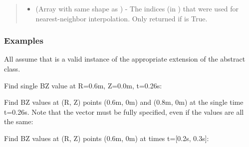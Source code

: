 \documentclass[letterpaper,10pt,english]{sphinxmanual}
\begin{document}
\begin{fulllineitems}
\begin{fulllineitems}
\begin{quote}
\begin{description}
\begin{itemize}
\item {} 
 (Array with same shape as ) - The indices
(in ) that were used for
nearest-neighbor interpolation. Only returned if  is
True.

\end{itemize}


\end{description}\end{quote}
\subsubsection*{Examples}

All assume that  is a valid instance of the appropriate
extension of the  abstract class.

Find single BZ value at R=0.6m, Z=0.0m, t=0.26s:

\begin{sphinxVerbatim}[commandchars=\\\{\}]
    
\end{sphinxVerbatim}

Find BZ values at (R, Z) points (0.6m, 0m) and (0.8m, 0m) at the
single time t=0.26s. Note that the  vector must be fully
specified, even if the values are all the same:

\begin{sphinxVerbatim}[commandchars=\\\{\}]
  \PYG{p}{[} \PYG{p}{]} \PYG{p}{[} \PYG{p}{]} 
\end{sphinxVerbatim}

Find BZ values at (R, Z) points (0.6m, 0m) at times t={[}0.2s, 0.3s{]}:

\begin{sphinxVerbatim}[commandchars=\\\{\}]
    \PYG{p}{[} \PYG{p}{]}
\end{sphinxVerbatim}


\end{fulllineitems}
\end{fulllineitems}
\end{document}
